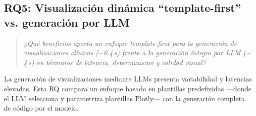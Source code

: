 \subsection{RQ5: Visualización dinámica ``template-first'' vs. generación por LLM}

\begin{quote}
\textit{¿Qué beneficios aporta un enfoque template-first para la generación de visualizaciones clínicas ($\sim$0.4\,s) frente a la generación íntegra por \ac{LLM} ($\sim$4\,s) en términos de latencia, determinismo y calidad visual?}
\end{quote}

La generación de visualizaciones mediante \ac{LLM}s presenta variabilidad y latencias elevadas. Esta \ac{RQ} compara un enfoque basado en plantillas predefinidas ---donde el LLM selecciona y parametriza plantillas Plotly--- con la generación completa de código por el modelo.

